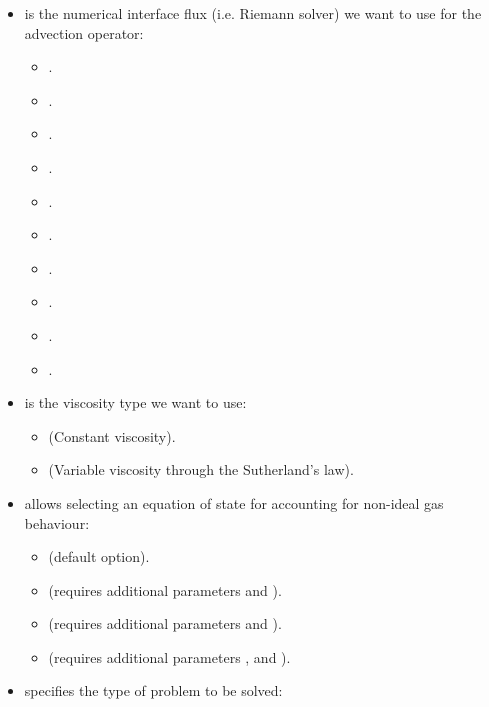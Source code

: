 \begin{itemize}
\begin{itemize}
      \item {} (Symmetric interior penalty method).
    \end{itemize}
    Note that only  and  are fully supported, the other operators work only
    with quadrilateral elements ($2D$ or $2.5D$).
  \item {} is the numerical interface flux (i.e. Riemann solver)
    we want to use for the advection operator:
    \begin{itemize}
      \item {}.
      \item {}.
      \item {}.
      \item {}.
      \item {}.
      \item {}.
      \item {}.
      \item {}.
      \item {}.
      \item {}.
    \end{itemize}
  \item {} is the viscosity type we want to use:
    \begin{itemize}
      \item {} (Constant viscosity).
      \item {} (Variable viscosity through the Sutherland's law).
    \end{itemize}
  \item {} allows selecting an equation of state for
    accounting for non-ideal gas behaviour:
    \begin{itemize}
        \item {} (default option).
        \item {} (requires additional parameters  and ).
        \item {} (requires additional parameters  and ).
        \item {} (requires additional parameters ,  and
          ).
      \end{itemize}
  \item {} specifies the type of problem to be solved:

\end{itemize}
